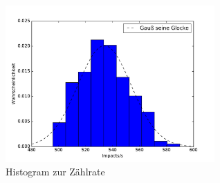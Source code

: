  \begin{figure}
   \centering
   \includegraphics[height=6cm]{plots/Statistik.pdf}
   \caption{Histogram zur Zählrate}
   \label{fig:hist}
 \end{figure}
